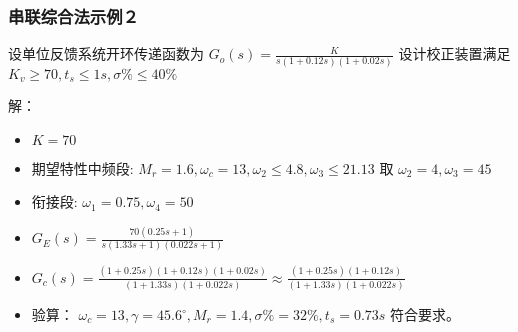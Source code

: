 \documentclass[table]{beamer}
\begin{document}
\begin{frame}
\frametitle{串联综合法示例２}
\label{sec-2-4}

设单位反馈系统开环传递函数为
$G_o(s)=\frac{K}{s(1+0.12s)(1+0.02s)}$ 设计校正装置满足 $K_v\geq 70,t_s\leq1s,\sigma\%\leq 40\%$

解：
\begin{itemize}
\item $K=70$
\item 期望特性中频段: $M_r=1.6,\omega_c=13,\omega_2\leq 4.8,\omega_3\leq 21.13$ 取 $\omega_2=4,\omega_3=45$
\item 衔接段:  $\omega_1=0.75,\omega_4=50$
\item $G_E(s)=\frac{70(0.25s+1)}{s(1.33s+1)(0.022s+1)}$
\item $G_c(s)=\frac{(1+0.25s)(1+0.12s)(1+0.02s)}{(1+1.33s)(1+0.022s)}\approx \frac{(1+0.25s)(1+0.12s)}{(1+1.33s)(1+0.022s)}$
\item 验算： $\omega_c=13,\gamma=45.6^{\circ},M_r=1.4,\sigma\%=32\%,t_s=0.73s$ 符合要求。
\end{itemize}
\end{frame}
\end{document}

